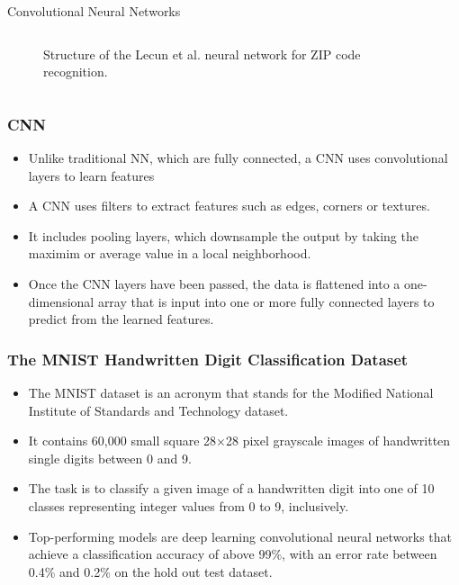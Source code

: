 \documentclass{beamer}
\begin{document}
\begin{frame}[fragile]{Convolutional Neural Networks}
\begin{columns}
\begin{column}{0.6\linewidth}
\begin{figure}
                \caption{Structure of the Lecun et al. neural network for ZIP code recognition\cite{lecun_backpropagation_1989}.}
                \label{Fig:CNN}
            \end{figure}
        \end{column}
     \end{columns}
\end{frame}

\begin{frame}
    \frametitle{CNN}
    \begin{itemize}
        \item Unlike traditional NN, which are fully connected, a CNN uses convolutional layers to learn features
        \item A CNN uses filters to extract features such as edges, corners or textures.
        \item It includes pooling layers, which downsample the output by taking the maximim or average value in a local neighborhood.
        \item Once the CNN layers have been passed, the data is flattened into a one-dimensional array that is input into one or more fully connected layers to predict from the learned features.
    \end{itemize}

    
\end{frame}

\begin{frame}
    \frametitle{The MNIST Handwritten Digit Classification Dataset}
    \begin{itemize}
        \item The MNIST dataset is an acronym that stands for the Modified National Institute of Standards and Technology dataset.
        \item It contains 60,000 small square 28×28 pixel grayscale images of handwritten single digits between 0 and 9.
        \item The task is to classify a given image of a handwritten digit into one of 10 classes representing integer values from 0 to 9, inclusively.
        \item  Top-performing models are deep learning convolutional neural networks that achieve a classification accuracy of above 99\%, with an error rate between 0.4\% and 0.2\% on the hold out test dataset.
    \end{itemize}
\end{frame}
\end{document}
